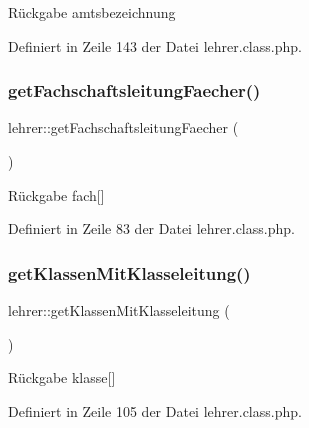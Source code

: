 \begin{DoxyReturn}{Rückgabe}
amtsbezeichnung 
\end{DoxyReturn}


Definiert in Zeile 143 der Datei lehrer.\+class.\+php.

\mbox{\label{classlehrer_a54b2f256532f40995d12bd1be85e30ed}} 
\subsubsection{\texorpdfstring{get\+Fachschaftsleitung\+Faecher()}{getFachschaftsleitungFaecher()}}
{\footnotesize\ttfamily lehrer\+::get\+Fachschaftsleitung\+Faecher (\begin{DoxyParamCaption}{ }\end{DoxyParamCaption})}

\begin{DoxyReturn}{Rückgabe}
fach\mbox{[}\mbox{]} 
\end{DoxyReturn}


Definiert in Zeile 83 der Datei lehrer.\+class.\+php.

\mbox{\label{classlehrer_aa6bf732c34bc2021887292a9d53bff8c}} 
\subsubsection{\texorpdfstring{get\+Klassen\+Mit\+Klasseleitung()}{getKlassenMitKlasseleitung()}}
{\footnotesize\ttfamily lehrer\+::get\+Klassen\+Mit\+Klasseleitung (\begin{DoxyParamCaption}{ }\end{DoxyParamCaption})}

\begin{DoxyReturn}{Rückgabe}
klasse\mbox{[}\mbox{]} 
\end{DoxyReturn}


Definiert in Zeile 105 der Datei lehrer.\+class.\+php.

\mbox{\label{classlehrer_a0afbb6b4e1917566563f415eaafacd32}} 
